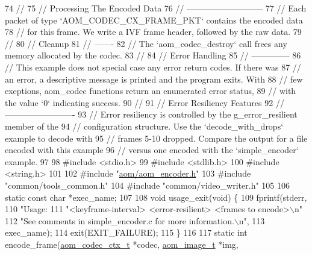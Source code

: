 \begin{DoxyCodeInclude}
74 \textcolor{comment}{//}
75 \textcolor{comment}{// Processing The Encoded Data}
76 \textcolor{comment}{// ---------------------------}
77 \textcolor{comment}{// Each packet of type `AOM\_CODEC\_CX\_FRAME\_PKT` contains the encoded data}
78 \textcolor{comment}{// for this frame. We write a IVF frame header, followed by the raw data.}
79 \textcolor{comment}{//}
80 \textcolor{comment}{// Cleanup}
81 \textcolor{comment}{// -------}
82 \textcolor{comment}{// The `aom\_codec\_destroy` call frees any memory allocated by the codec.}
83 \textcolor{comment}{//}
84 \textcolor{comment}{// Error Handling}
85 \textcolor{comment}{// --------------}
86 \textcolor{comment}{// This example does not special case any error return codes. If there was}
87 \textcolor{comment}{// an error, a descriptive message is printed and the program exits. With}
88 \textcolor{comment}{// few exeptions, aom\_codec functions return an enumerated error status,}
89 \textcolor{comment}{// with the value `0` indicating success.}
90 \textcolor{comment}{//}
91 \textcolor{comment}{// Error Resiliency Features}
92 \textcolor{comment}{// -------------------------}
93 \textcolor{comment}{// Error resiliency is controlled by the g\_error\_resilient member of the}
94 \textcolor{comment}{// configuration structure. Use the `decode\_with\_drops` example to decode with}
95 \textcolor{comment}{// frames 5-10 dropped. Compare the output for a file encoded with this example}
96 \textcolor{comment}{// versus one encoded with the `simple\_encoder` example.}
97 
98 \textcolor{preprocessor}{#include <stdio.h>}
99 \textcolor{preprocessor}{#include <stdlib.h>}
100 \textcolor{preprocessor}{#include <string.h>}
101 
102 \textcolor{preprocessor}{#include "\hyperlink{aom__encoder_8h}{aom/aom\_encoder.h}"}
103 \textcolor{preprocessor}{#include "common/tools\_common.h"}
104 \textcolor{preprocessor}{#include "common/video\_writer.h"}
105 
106 \textcolor{keyword}{static} \textcolor{keyword}{const} \textcolor{keywordtype}{char} *exec\_name;
107 
108 \textcolor{keywordtype}{void} usage\_exit(\textcolor{keywordtype}{void}) \{
109   fprintf(stderr,
110           \textcolor{stringliteral}{"Usage: %
111           \textcolor{stringliteral}{"<keyframe-interval> <error-resilient> <frames to encode>\(\backslash\)n"}
112           \textcolor{stringliteral}{"See comments in simple\_encoder.c for more information.\(\backslash\)n"},
113           exec\_name);
114   exit(EXIT\_FAILURE);
115 \}
116 
117 \textcolor{keyword}{static} \textcolor{keywordtype}{int} encode\_frame(\hyperlink{structaom__codec__ctx}{aom\_codec\_ctx\_t} *codec, \hyperlink{structaom__image}{aom\_image\_t} *img,
}
\end{DoxyCodeInclude}
